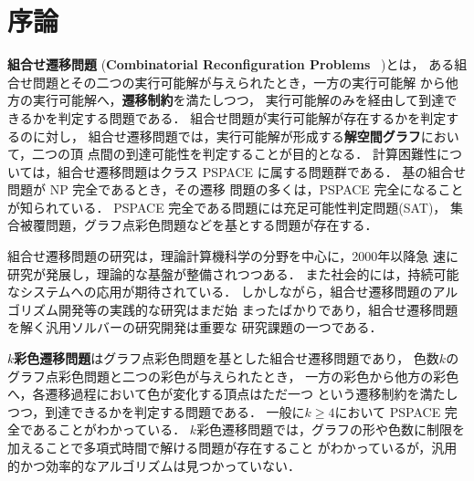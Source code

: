 ﻿%
\section{序論} \label{chap:introduction}


\textbf{組合せ遷移問題} (\textbf{Combinatorial Reconfiguration Problems}
~\cite{Ito18:tohoku})とは，
ある組合せ問題とその二つの実行可能解が与えられたとき，一方の実行可能解
から他方の実行可能解へ，\textbf{遷移制約}を満たしつつ，
実行可能解のみを経由して到達できるかを判定する問題である．
組合せ問題が実行可能解が存在するかを判定するのに対し，
組合せ遷移問題では，実行可能解が形成する\textbf{解空間グラフ}において，二つの頂
点間の到達可能性を判定することが目的となる．
計算困難性については，組合せ遷移問題はクラス PSPACE に属する問題群である．
基の組合せ問題が NP 完全であるとき，その遷移
問題の多くは，PSPACE 完全になることが知られている．
PSPACE 完全である問題には充足可能性判定問題(SAT)，
集合被覆問題，グラフ点彩色問題などを基とする問題が存在する．

組合せ遷移問題の研究は，理論計算機科学の分野を中心に，2000年以降急
速に研究が発展し，理論的な基盤が整備されつつある．
また社会的には，持続可能なシステムへの応用が期待されている．
しかしながら，組合せ遷移問題のアルゴリズム開発等の実践的な研究はまだ始
まったばかりであり，組合せ遷移問題を解く汎用ソルバーの研究開発は重要な
研究課題の一つである．



\textbf{$k$彩色遷移問題}はグラフ点彩色問題を基とした組合せ遷移問題であり，
色数$k$のグラフ点彩色問題と二つの彩色が与えられたとき，
一方の彩色から他方の彩色へ，各遷移過程において色が変化する頂点はただ一つ
という遷移制約を満たしつつ，到達できるかを判定する問題である．
一般に$k \ge 4$において PSPACE 完全であることがわかっている．
$k$彩色遷移問題では，グラフの形や色数に制限を加えることで多項式時間で解ける問題が存在すること
がわかっているが，汎用的かつ効率的なアルゴリズムは見つかっていない．

